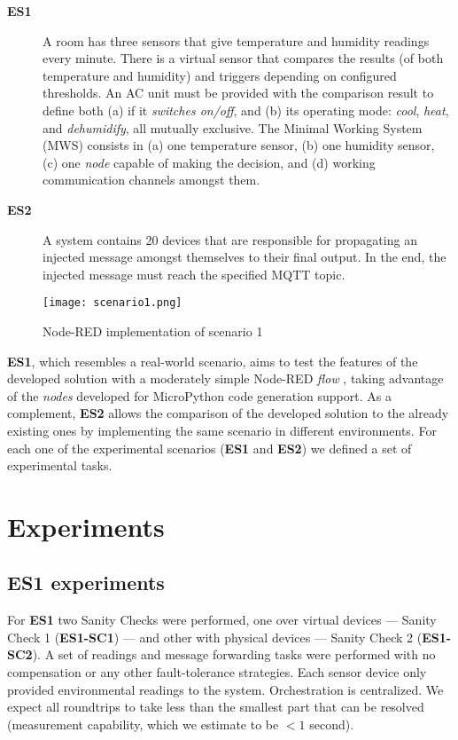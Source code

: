 \begin{description}
    \item[\textbf{ES1}] A room has three sensors that give temperature and humidity readings every minute. There is a virtual sensor that compares the results (of both temperature and humidity) and triggers depending on configured thresholds. An AC unit must be provided with the comparison result to define both (a) if it \textit{switches on/off}, and (b) its operating mode: \textit{cool}, \textit{heat}, and \textit{dehumidify}, all mutually exclusive. The Minimal Working System (MWS) consists in (a) one temperature sensor, (b) one humidity sensor, (c) one \textit{node} capable of making the decision, and (d) working communication channels amongst them.
    \item[\textbf{ES2}] A system contains 20 devices that are responsible for propagating an injected message amongst themselves to their final output. In the end, the injected message must reach the specified MQTT topic.
\end{description}

\begin{figure}[h]
\centering
\texttt{[image: scenario1.png]}
\caption[Node-RED implementation of scenario 1]{Node-RED implementation of scenario 1}\label{fig:scenario1_node_red}
\end{figure}

\textbf{ES1}, which resembles a real-world scenario, aims to test the features of the developed solution with a moderately simple Node-RED \textit{flow} , taking advantage of the \textit{nodes} developed for MicroPython code generation support. As a complement, \textbf{ES2} allows the comparison of the developed solution to the already existing ones by implementing the same scenario in different environments. For each one of the experimental scenarios (\ie \textbf{ES1} and \textbf{ES2}) we defined a set of experimental tasks. 

\section{Experiments}\label{sec:experiments}

\subsection{ES1 experiments}

For \textbf{ES1} two Sanity Checks were performed, one over virtual devices --- Sanity Check 1 (\textbf{ES1-SC1}) --- and other with physical devices --- Sanity Check 2 (\textbf{ES1-SC2}). A set of readings and message forwarding tasks were performed with no compensation or any other fault-tolerance strategies. Each sensor device only provided environmental readings to the system. Orchestration is centralized. We expect all roundtrips to take less than the smallest part that can be resolved (measurement capability, which we estimate to be $<1$ second).


